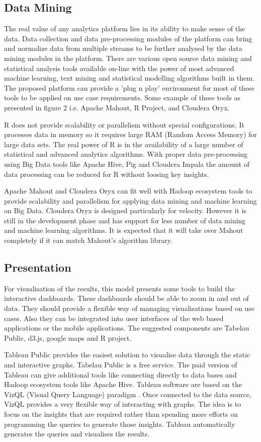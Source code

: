 \subsection{Data Mining}
The real value of any analytics platform lies in its ability to make sense of the data. Data collection and data pre-processing modules of the platform can bring and normalize data from multiple streams to be further analysed by the data mining modules in the platform. There are various open source data mining and statistical analysis tools available on-line with the power of most advanced machine learning, text mining and statistical modelling algorithms built in them.  The proposed platform can provide a 'plug n play' environment for most of these tools to be applied on use case requirements. Some example of these tools as presented in figure 2 i.e. Apache Mahout, R Project, and Cloudera Oryx. 

R does not provide scalability or parallelism without special configurations. It processes data in memory so it requires large RAM (Random Access Memory) for large data sets. The real power of R is in the availability of a large number of statistical and advanced analytics algorithms. With proper data pre-processing using Big Data tools like Apache Hive, Pig and Cloudera Impala the amount of data processing can be reduced for R without loosing key insights.

 Apache Mahout and Cloudera Oryx can fit well with Hadoop ecosystem tools to provide scalability and parallelism for applying data mining and machine learning on Big Data. Cloudera Oryx is designed particularly for velocity. However it is still in the development phase and has support for less number of data mining and machine learning algorithms. It is expected that it will take over Mahout completely if it can match Mahout's algorithm library.  
\subsection{Presentation}  
For visualisation of the results, this model presents some tools to build the interactive dashboards. These dashboards should be able to zoom in and out of data. They should provide a flexible way of managing visualisations based on use cases. Also they can be integrated into user interfaces of the web based applications or the mobile applications. The suggested components are Tabelau Public, d3.js, google maps and R project.

Tableau Public provides the easiest solution to visualise data through the static and interactive graphs. Tabelau Public is a free service. The paid version of Tableau can give additional tools like connecting directly to data bases and Hadoop ecosystem tools like Apache Hive. Tableau software are based on the VizQL (Visual Query Language) paradigm \cite{hanrahan2006vizql}. Once connected to the data source, VizQL  provides a very flexible way of interacting with graphs. The idea is to focus on the insights that are required rather than spending more efforts on programming the queries to generate those insights. Tableau automatically generates the queries and visualises the results.


